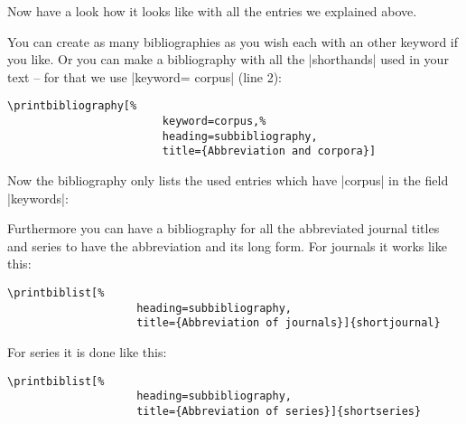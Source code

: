 \documentclass[a4paper,
10pt,
greek,
french,
spanish,
italian,
ngerman,
english
]{ltxdoc}
\begin{document}
\begin{refsection}
\nocite{*}
Now have a look how it looks like with all the entries we explained above.
\begin{bsp}
\renewcommand\bibfont{\normalfont\footnotesize}
\printbibheading[%
							heading=bibliography,%
							title={Bibliography}] %

\printbibliography[%
							keyword=ancient,%
							heading=subbibliography,
							title={Ancient authors and works}]

\printbibliography[%
							notkeyword=ancient,%
							notkeyword=corpus,%
							heading=subbibliography,
							title={Secondary literature}]
\end{bsp}

You can create as many bibliographies as you wish each with an other keyword if you like.
Or you can make a bibliography with all the |shorthands| used in your text -- for that we use |keyword= {corpus}| (line 2):
\begin{lstlisting}
\printbibliography[%
						keyword=corpus,%
						heading=subbibliography,
					 	title={Abbreviation and corpora}]
\end{lstlisting}
Now the bibliography only lists the used entries which have |corpus| in the field |keywords|:
\begin{bsp}
\printbibliography[%
						keyword={corpus},
          				heading=subbibliography,
            			title={Abbreviation of corpora}]\label{bib:corpus}
\end{bsp}

Furthermore you can have a bibliography for all the abbreviated journal titles and series to have the abbreviation and its long form.
For journals it works like this:
\begin{lstlisting}
\printbiblist[%
					heading=subbibliography,
					title={Abbreviation of journals}]{shortjournal}
\end{lstlisting}

\begin{bsp}
\end{bsp}

For series it is done like this:
\begin{lstlisting}
\printbiblist[%
					heading=subbibliography,
					title={Abbreviation of series}]{shortseries}
\end{lstlisting}


\begin{bsp}
\end{bsp}

\end{refsection}
\end{document}
